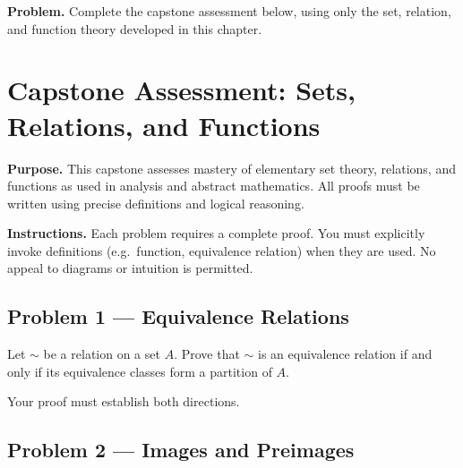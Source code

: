 \newpage
{}
\label{cap:sets-relations-functions}

\begin{tcolorbox}[
  colback=gray!6,
  colframe=gray!40,
  arc=2pt,
  left=8pt, right=8pt, top=6pt, bottom=6pt,
  title={\small\textbf{Capstone Problem}},
  fonttitle=\small\bfseries
]
\textbf{Problem.}
Complete the capstone assessment below, using only the set, relation, and
function theory developed in this chapter.
\end{tcolorbox}


\section{Capstone Assessment: Sets, Relations, and Functions}

\noindent
\textbf{Purpose.}
This capstone assesses mastery of elementary set theory,
relations, and functions as used in analysis and abstract mathematics.
All proofs must be written using precise definitions and logical reasoning.

\vspace{1em}

\noindent
\textbf{Instructions.}
Each problem requires a complete proof.
You must explicitly invoke definitions (e.g.\ function, equivalence relation)
when they are used.
No appeal to diagrams or intuition is permitted.

\vspace{1.5em}

\subsection*{Problem 1 --- Equivalence Relations}

Let $\sim$ be a relation on a set $A$.
Prove that $\sim$ is an equivalence relation if and only if
its equivalence classes form a partition of $A$.

Your proof must establish both directions.

\vspace{1.5em}

\subsection*{Problem 2 --- Images and Preimages}

